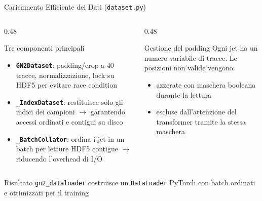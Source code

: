 \documentclass[aspectratio=169, 10pt]{beamer}
\begin{document}
\begin{frame}{Caricamento Efficiente dei Dati (\texttt{dataset.py})}
    \begin{columns}[T]
        \begin{column}{0.48\textwidth}
            \begin{block}{Tre componenti principali}
                \begin{itemize}
                    \item \textbf{\texttt{GN2Dataset}}: padding/crop a 40 tracce, normalizzazione, lock su HDF5 per evitare race condition
                    \item \textbf{\texttt{\_IndexDataset}}: restituisce solo gli indici dei campioni $\to$ garantendo accessi ordinati e contigui su disco
                    \item \textbf{\texttt{\_BatchCollator}}: ordina i jet in un batch per letture HDF5 contigue $\to$ riducendo l'overhead di I/O
                \end{itemize}
            \end{block}
        \end{column}
        \begin{column}{0.48\textwidth}
            \begin{block}{Gestione del padding}
                Ogni jet ha un numero variabile di tracce. Le posizioni non valide vengono:
                \begin{itemize}
                    \item azzerate con maschera booleana durante la lettura
                    \item escluse dall'attenzione del transformer tramite la stessa maschera
                \end{itemize}
            \end{block}
        \end{column}
    \end{columns}
    \begin{alertblock}{Risultato}
        \texttt{gn2\_dataloader} costruisce un \texttt{DataLoader} PyTorch con batch ordinati e ottimizzati per il training
    \end{alertblock}
\end{frame}
\end{document}
